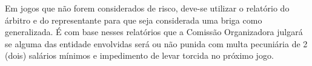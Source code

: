 \begin{article}
	Em jogos que não forem considerados de risco, deve-se utilizar o relatório do árbitro e do representante para que seja considerada uma briga como generalizada. É com base nesses relatórios que a Comissão Organizadora julgará se alguma das entidade envolvidas será ou não punida com multa pecuniária de 2 (dois) salários mínimos e impedimento de levar torcida no próximo jogo.
\end{article}